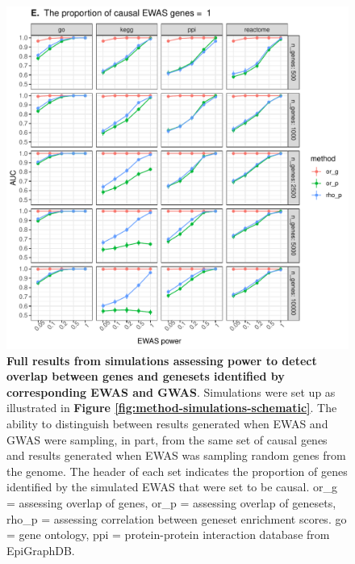 \documentclass[11pt,oneside]{bristolthesis}
\begin{document}
\begin{figure}

{\centering \includegraphics[width=1\linewidth]{figure/06-ewas_gwas_comparison/method_test_gene_up_all/PEC_1} 

}

\caption[Full results from simulations assessing power to detect overlap between genes and genesets identified by corresponding EWAS and GWAS]{\textbf{Full results from simulations assessing power to detect overlap between genes and genesets identified by corresponding EWAS and GWAS}. Simulations were set up as illustrated in \textbf{Figure \ref{fig:method-simulations-schematic}}. The ability to distinguish between results generated when EWAS and GWAS were sampling, in part, from the same set of causal genes and results generated when EWAS was sampling random genes from the genome. The header of each set indicates the proportion of genes identified by the simulated EWAS that were set to be causal. or\_g = assessing overlap of genes, or\_p = assessing overlap of genesets, rho\_p = assessing correlation between geneset enrichment scores. go = gene ontology, ppi = protein-protein interaction database from EpiGraphDB.}\label{fig:sim1-full-plot5}
\end{figure}
\end{document}
